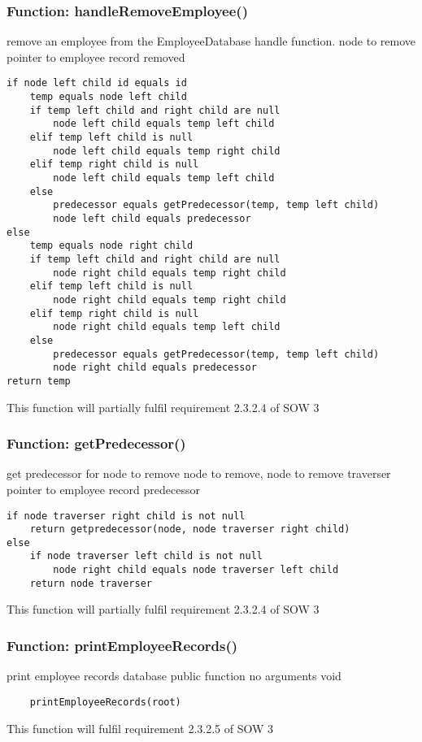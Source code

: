 \documentclass[12pt]{article}%
\newcounter{subsubsubsection}[subsubsection]
\begin{document}
\subsubsection{Function: handleRemoveEmployee()}
remove an employee from the EmployeeDatabase handle function.
node to remove
pointer to employee record removed
\begin{verbatim}
if node left child id equals id
    temp equals node left child
    if temp left child and right child are null
        node left child equals temp left child
    elif temp left child is null
        node left child equals temp right child
    elif temp right child is null
        node left child equals temp left child
    else
        predecessor equals getPredecessor(temp, temp left child)
        node left child equals predecessor
else
    temp equals node right child
    if temp left child and right child are null
        node right child equals temp right child
    elif temp left child is null
        node right child equals temp right child
    elif temp right child is null
        node right child equals temp left child
    else
        predecessor equals getPredecessor(temp, temp left child)
        node right child equals predecessor
return temp
\end{verbatim}
This function will partially fulfil requirement 2.3.2.4 of SOW 3

\subsubsection{Function: getPredecessor()}
get predecessor for node to remove
node to remove, node to remove traverser
pointer to employee record predecessor
\begin{verbatim}
if node traverser right child is not null
    return getpredecessor(node, node traverser right child)
else
    if node traverser left child is not null
        node right child equals node traverser left child
    return node traverser
\end{verbatim}
This function will partially fulfil requirement 2.3.2.4 of SOW 3

\subsubsection{Function: printEmployeeRecords()}
print employee records database public function
no arguments
void
\begin{verbatim}
    printEmployeeRecords(root)
\end{verbatim}
This function will fulfil requirement 2.3.2.5 of SOW 3
\end{document}

